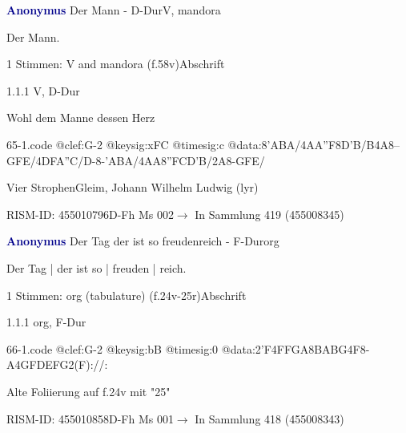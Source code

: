 \documentclass[twocolumn, 12pt]{book}
\begin{document}
\par \vspace{16pt} \textcolor{darkblue}{\textbf{Anonymus  }}\hfillplus{\textbf{[65]}}\newline Der Mann - D-Dur\newline V, mandora
\par \begin{itshape}[heading, f.58v:] Der Mann.\end{itshape} 
\par \textcolor{darkblue}{}  1 Stimmen: V and mandora  (f.58v)\newline Abschrift
\par 1.1.1  V, D-Dur\newline \begin{footnotesize} Wohl dem Manne dessen Herz \end{footnotesize}  
\begin{filecontents*}{65-1.code}
@clef:G-2
@keysig:xFC
@timesig:c
@data:8'ABA/4AA''F8D'B/B4A8--GFE/4DFA''C/D-8-'ABA/4AA{8''FC}{D'B}/2A8-GFE/
\end{filecontents*}
\newline %
\par Vier Strophen\newline Gleim, Johann Wilhelm Ludwig  (lyr)
\par RISM-ID: 455010796\newline D-Fh  Ms 002\newline $\rightarrow$ In Sammlung 419 (455008345)
      
\par \vspace{16pt} \textcolor{darkblue}{\textbf{Anonymus  }}\hfillplus{\textbf{[66]}}\newline Der Tag der ist so freudenreich - F-Dur\newline org
\par \begin{itshape}[f.25r, at left:] Der Tag | der ist so | freuden | reich.\end{itshape} 
\par \textcolor{darkblue}{}  1 Stimmen: org (tabulature)  (f.24v-25r)\newline Abschrift
\par 1.1.1  org, F-Dur  
\begin{filecontents*}{66-1.code}
@clef:G-2
@keysig:bB
@timesig:0
@data:2'F4FFGA{8BABG}4F8-A4GFDEFG2(F)://:
\end{filecontents*}
\newline %
\par Alte Foliierung auf f.24v mit "25"
\par RISM-ID: 455010858\newline D-Fh  Ms 001\newline $\rightarrow$ In Sammlung 418 (455008343)
      
\end{document}
